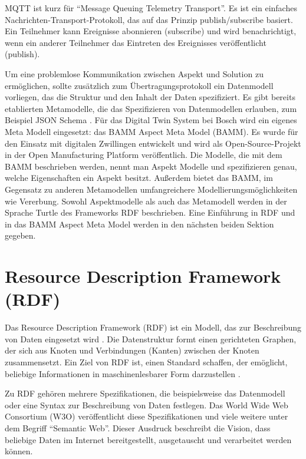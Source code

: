 MQTT ist kurz für "`Message Queuing Telemetry Transport"'. Es ist ein einfaches Nachrichten-Transport-Protokoll, das auf das Prinzip publish/subscribe basiert. Ein Teilnehmer kann Ereignisse abonnieren (subscribe) und wird benachrichtigt, wenn ein anderer Teilnehmer das Eintreten des Ereignisses veröffentlicht (publish). \cite[vgl.][]{banks2019mqtt}

Um eine problemlose Kommunikation zwischen Aspekt und Solution zu ermöglichen, sollte zusätzlich zum Übertragungsprotokoll ein Datenmodell vorliegen, das die Struktur und den Inhalt der Daten spezifiziert. Es gibt bereits etablierten Metamodelle, die das Spezifizieren von Datenmodellen erlauben, zum Beispiel JSON Schema \cite[vgl.][]{wrigth2022jsonschema}. Für das Digital Twin System bei Bosch wird ein eigenes Meta Modell eingesetzt: das BAMM Aspect Meta Model (BAMM). Es wurde für den Einsatz mit digitalen Zwillingen entwickelt und wird als Open-Source-Projekt in der Open Manufacturing Platform veröffentlich. Die Modelle, die mit dem BAMM beschrieben werden, nennt man Aspekt Modelle und spezifizieren genau, welche Eigenschaften ein Aspekt besitzt. Außerdem bietet das BAMM, im Gegensatz zu anderen Metamodellen umfangreichere Modellierungsmöglichkeiten wie Vererbung. Sowohl Aspektmodelle als auch das Metamodell werden in der Sprache Turtle des Frameworks RDF beschrieben. Eine Einführung in RDF und in das BAMM Aspect Meta Model werden in den nächsten beiden Sektion gegeben.


\section{Resource Description Framework (RDF)}

Das Resource Description Framework (RDF) ist ein Modell, das zur Beschreibung von Daten eingesetzt wird \cite[vgl.][]{w3c2014rdf}. Die Datenstruktur formt einen gerichteten Graphen, der sich aus Knoten und Verbindungen (Kanten) zwischen der Knoten zusammensetzt. Ein Ziel von RDF ist, einen Standard schaffen, der emöglicht, beliebige Informationen in maschinenlesbarer Form darzustellen \cite[vgl.][Sektion 2]{w3c2014rdfprimer}.

Zu RDF gehören mehrere Spezifikationen, die beispielsweise das Datenmodell oder eine Syntax zur Beschreibung von Daten festlegen. Das World Wide Web Consortium (W3O) veröffentlicht diese Spezifikationen und viele weitere unter dem Begriff "`Semantic Web"'. Dieser Ausdruck beschreibt die Vision, dass beliebige Daten im Internet bereitgestellt, ausgetauscht und verarbeitet werden können. \cite[vgl.][]{w3c2014semanticweb}

